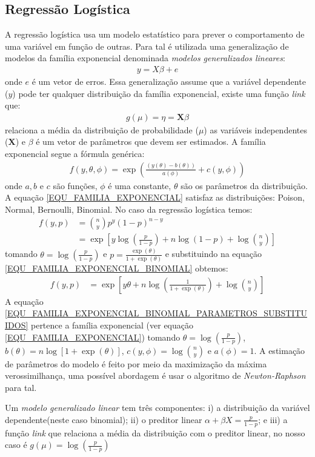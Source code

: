 \subsection{Regressão Logística}
A regressão logística usa um modelo estatístico para prever o comportamento de uma variável em função de outras. Para tal é utilizada uma generalização de modelos da família exponencial denominada \emph{modelos generalizados lineares}:
\begin{align}
y = X \beta + e
\end{align}
onde \(e\) é um vetor de erros. Essa generalização assume que a variável dependente (\(y\)) pode ter qualquer distribuição da família exponencial, existe uma função \emph{link} que:
\begin{align}
g(\mu) = \eta = \mathbf{X}\beta
\end{align}
relaciona a média da distribuição de probabilidade (\(\mu\)) as variáveis independentes (\(\mathbf{X}\)) e \(\beta\) é um vetor de parâmetros que devem ser estimados.
A família exponencial segue a fórmula genérica:
\begin{align}
f(y, \theta, \phi) = \exp \left( \frac{( y(\theta) - b(\theta) )} {a(\phi)} + c(y, \phi)\right) \label{EQU_FAMILIA_EXPONENCIAL}
\end{align}
onde \(a, b \) e \( c\) são funções, \(\phi\) é uma constante, \(\theta\) são os parâmetros da distribuição. A equação \ref{EQU_FAMILIA_EXPONENCIAL} satisfaz as distribuições: Poison, Normal, Bernoulli, Binomial. No caso da regressão logística temos:
\begin{align}
f(y, p) &=  \binom{n}{y} p^{y}(1 - p)^{n - y} \\
		&= \exp \left[ y\log \left( \frac{p}{1 - p} \right) + n\log(1-p) + \log \binom{n}{y} \right] \label{EQU_FAMILIA_EXPONENCIAL_BINOMIAL}
\end{align}
tomando \(\theta = \log \left( \frac{p}{1 - p} \right)\) e \( p = \frac{\exp(\theta)}{1+\exp(\theta)} \) e substituindo na equação \eqref{EQU_FAMILIA_EXPONENCIAL_BINOMIAL} obtemos:
\begin{align}
f(y, p) &= \exp \left[ y\theta + n\log(\frac{1}{1+\exp(\theta)}) + \log \binom{n}{y} \right]	\label{EQU_FAMILIA_EXPONENCIAL_BINOMIAL_PARAMETROS_SUBSTITUIDOS}
\end{align}
A equação \eqref{EQU_FAMILIA_EXPONENCIAL_BINOMIAL_PARAMETROS_SUBSTITUIDOS} pertence a família exponencial (ver equação \eqref{EQU_FAMILIA_EXPONENCIAL}) tomando \(\theta = \log \left( \frac{p}{1 - p} \right)\), \(b(\theta) = n\log[1+\exp(\theta)]\), \(c(y, \phi) = \log \binom{n}{y}\) e \(a(\phi) = 1\).
A estimação de parâmetros do modelo é feito por meio da maximização da máxima verossimilhança, uma possível abordagem é usar o algoritmo de \emph{Newton-Raphson}
para tal.

Um \emph{modelo generalizado linear} tem três componentes: i) a distribuição da variável dependente(neste caso binomial); ii) o preditor linear \(\alpha + \beta X = \frac{p}{1 - p} \); e iii) a função \emph{link} que relaciona a média da distribuição com o preditor linear, no nosso caso é \(g(\mu) = \log(\frac{p}{1-p})\)
